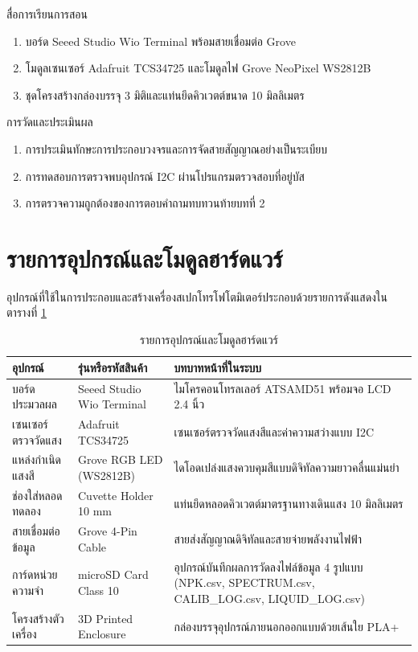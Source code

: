 \begin{planbox}{สื่อการเรียนการสอน}
\begin{enumerate}[leftmargin=1.5em, itemsep=1pt]
    \item บอร์ด Seeed Studio Wio Terminal พร้อมสายเชื่อมต่อ Grove
    \item โมดูลเซนเซอร์ Adafruit TCS34725 และโมดูลไฟ Grove NeoPixel WS2812B
    \item ชุดโครงสร้างกล่องบรรจุ 3 มิติและแท่นยึดคิวเวตต์ขนาด 10 มิลลิเมตร
\end{enumerate}
\end{planbox}

\begin{planbox}{การวัดและประเมินผล}
\begin{enumerate}[leftmargin=1.5em, itemsep=1pt]
    \item การประเมินทักษะการประกอบวงจรและการจัดสายสัญญาณอย่างเป็นระเบียบ
    \item การทดสอบการตรวจพบอุปกรณ์ I2C ผ่านโปรแกรมตรวจสอบที่อยู่บัส
    \item การตรวจความถูกต้องของการตอบคำถามทบทวนท้ายบทที่ 2
\end{enumerate}
\end{planbox}

\clearpage

\section{รายการอุปกรณ์และโมดูลฮาร์ดแวร์}
อุปกรณ์ที่ใช้ในการประกอบและสร้างเครื่องสเปกโทรโฟโตมิเตอร์ประกอบด้วยรายการดังแสดงในตารางที่ \ref{tab:components}

\begin{table}[H]
    \caption{รายการอุปกรณ์และโมดูลฮาร์ดแวร์}
    \label{tab:components}
    \begin{tabularx}{\textwidth}{p{3.2cm}p{4.2cm}X}
        \toprule
        \textbf{อุปกรณ์} & \textbf{รุ่นหรือรหัสสินค้า} & \textbf{บทบาทหน้าที่ในระบบ} \\
        \midrule
        บอร์ดประมวลผล & Seeed Studio Wio Terminal & ไมโครคอนโทรลเลอร์ ATSAMD51 พร้อมจอ LCD 2.4 นิ้ว \\
        เซนเซอร์ตรวจวัดแสง & Adafruit TCS34725 & เซนเซอร์ตรวจวัดแสงสีและค่าความสว่างแบบ I2C \\
        แหล่งกำเนิดแสงสี & Grove RGB LED (WS2812B) & ไดโอดเปล่งแสงควบคุมสีแบบดิจิทัลความยาวคลื่นแม่นยำ \\
        ช่องใส่หลอดทดลอง & Cuvette Holder 10 mm & แท่นยึดหลอดคิวเวตต์มาตรฐานทางเดินแสง 10 มิลลิเมตร \\
        สายเชื่อมต่อข้อมูล & Grove 4-Pin Cable & สายส่งสัญญาณดิจิทัลและสายจ่ายพลังงานไฟฟ้า \\
        การ์ดหน่วยความจำ & microSD Card Class 10 & อุปกรณ์บันทึกผลการวัดลงไฟล์ข้อมูล 4 รูปแบบ (NPK.csv, SPECTRUM.csv, CALIB\_LOG.csv, LIQUID\_LOG.csv) \\
        โครงสร้างตัวเครื่อง & 3D Printed Enclosure & กล่องบรรจุอุปกรณ์ภายนอกออกแบบด้วยเส้นใย PLA+ \\
        \bottomrule
    \end{tabularx}
\end{table}

